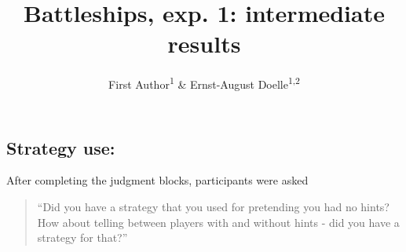 \documentclass[
  english,
  man]{apa6}
\title{Battleships, exp. 1: intermediate results}
\author{First Author\textsuperscript{1} \& Ernst-August Doelle\textsuperscript{1,2}}
\date{}
\affiliation{\vspace{0.5cm}\textsuperscript{1} Wilhelm-Wundt-University\\\textsuperscript{2} Konstanz Business School}
\begin{document}
\maketitle

\hypertarget{strategy-use}{%
\subsection{Strategy use:}\label{strategy-use}}

After completing the judgment blocks, participants were asked

\begin{quote}
``Did you have a strategy that you used for pretending you had no hints? How about telling between players with and without hints - did you have a strategy for that?''
\end{quote}
\end{document}
